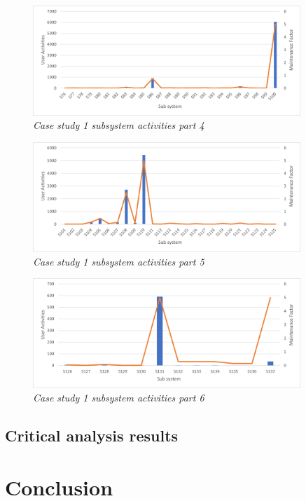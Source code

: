 \begin{figure}[!htb]
	\centering %
	\includegraphics[width=0.9\textwidth]{img/ch3/uat/systemA/s76_s100.png}
	\caption[Case study 1 subsystem activities part 4]
	{\textit{Case study 1 subsystem activities part 4}}\label{fig:ch3_saS76S100}
\end{figure} 

\begin{figure}[!htb]
	\centering %
	\includegraphics[width=0.9\textwidth]{img/ch3/uat/systemA/s101_s125.png}
	\caption[Case study 1 subsystem activities part 5]
	{\textit{Case study 1 subsystem activities part 5}}\label{fig:ch3_saS101S125}
\end{figure} 

\begin{figure}[!htb]
	\centering %
	\includegraphics[width=0.9\textwidth]{img/ch3/uat/systemA/s126_s138.png}
	\caption[Case study 1 subsystem activities part 6]
	{\textit{Case study 1 subsystem activities part 6}}\label{fig:ch3_saS126S138}
\end{figure} 

\subsection{Critical analysis results}

\section{Conclusion}